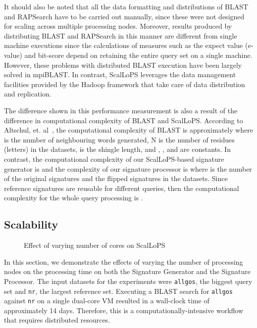 \documentclass[titlepage]{csetr}
\begin{document}
It should also be noted that all the data formatting and distributions of BLAST and RAPSearch have to be carried out manually, since these were not designed for scaling across multiple processing nodes. Moreover, results produced by distributing BLAST and RAPSearch in this manner are different from single machine executions since the calculations of measures such as the expect value (e-value) and bit-score depend on retaining the entire query set on a single machine. However, these problems with distributed BLAST execution have been largely solved in mpiBLAST. In contrast, ScalLoPS leverages the data management facilities provided by the Hadoop framework that take care of data distribution and replication. 

The difference shown in this performance measurement is also a result of the difference in computational complexity of BLAST and ScalLoPS. According to Altschul, et. al~\cite{BLAST}, the computational complexity of BLAST is approximately  where  is the number of neighbouring words generated, N is the number of residues (letters) in the datasets,  is the shingle length, and , , and  are constants. In contrast, the computational complexity of our ScalLoPS-based signature generator is  and the complexity of our signature processor is  where  is the number of the original signatures and the flipped signatures in the datasets. Since reference signatures are reusable for different queries, then the computational complexity for the whole query processing is .

\subsection{Scalability}


\begin{figure}[t]
\centering
{}
\caption{Effect of varying number of cores on ScalLoPS}
\label{fig:exp-scalability}
\end{figure}

In this section, we demonstrate the effects of varying the number of processing nodes on the processing time on both the Signature Generator and the Signature Processor. The input datasets for the experiments were \texttt{allgos}, the biggest query set and \texttt{nr}, the largest reference set. Executing a BLAST search for \texttt{allgos} against \texttt{nr} on a single dual-core VM resulted in a wall-clock time of approximately 14 days. Therefore, this is a computationally-intensive workflow that requires distributed resources. 
\end{document}
